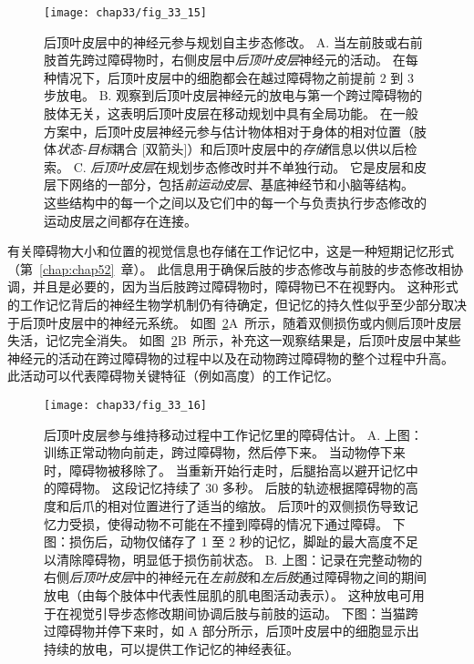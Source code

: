 \begin{figure}[htbp]
	\centering
	\texttt{[image: chap33/fig\_33\_15]}
	\caption{后顶叶皮层中的神经元参与规划自主步态修改。
		A. 当左前肢或右前肢首先跨过障碍物时，右侧皮层中\textit{后顶叶皮层}神经元的活动。
		在每种情况下，后顶叶皮层中的细胞都会在越过障碍物之前提前 2 到 3 步放电。
		B. 观察到后顶叶皮层神经元的放电与第一个跨过障碍物的肢体无关，这表明后顶叶皮层在移动规划中具有全局功能。
		在一般方案中，后顶叶皮层神经元参与估计物体相对于身体的相对位置（肢体\textit{状态-目标}耦合 [双箭头]）和后顶叶皮层中的\textit{存储}信息以供以后检索。
		C. \textit{后顶叶皮层}在规划步态修改时并不单独行动。
		它是皮层和皮层下网络的一部分，包括\textit{前运动皮层}、基底神经节和小脑等结构。
		这些结构中的每一个之间以及它们中的每一个与负责执行步态修改的运动皮层之间都存在连接\cite{drew2015taking}。}
	\label{fig:33_15}
\end{figure}


有关障碍物大小和位置的视觉信息也存储在工作记忆中，这是一种短期记忆形式（第~\ref{chap:chap52}~章）。
此信息用于确保后肢的步态修改与前肢的步态修改相协调，并且是必要的，因为当后肢跨过障碍物时，障碍物已不在视野内。
这种形式的工作记忆背后的神经生物学机制仍有待确定，但记忆的持久性似乎至少部分取决于后顶叶皮层中的神经元系统。
如图~\ref{fig:33_16}A~所示，随着双侧损伤或内侧后顶叶皮层失活，记忆完全消失。
如图~\ref{fig:33_16}B~所示，补充这一观察结果是，后顶叶皮层中某些神经元的活动在跨过障碍物的过程中以及在动物跨过障碍物的整个过程中升高。
此活动可以代表障碍物关键特征（例如高度）的工作记忆。


\begin{figure}[htbp]
	\centering
	\texttt{[image: chap33/fig\_33\_16]}
	\caption{后顶叶皮层参与维持移动过程中工作记忆里的障碍估计。
		A. 上图：训练正常动物向前走，跨过障碍物，然后停下来。
		当动物停下来时，障碍物被移除了。
		当重新开始行走时，后腿抬高以避开记忆中的障碍物。
		这段记忆持续了 30 多秒。
		后肢的轨迹根据障碍物的高度和后爪的相对位置进行了适当的缩放。
		后顶叶的双侧损伤导致记忆力受损，使得动物不可能在不撞到障碍的情况下通过障碍。
		下图：损伤后，动物仅储存了 1 至 2 秒的记忆，脚趾的最大高度不足以清除障碍物，明显低于损伤前状态\cite{mcvea2009object}。
		B. 上图：记录在完整动物的右侧\textit{后顶叶皮层}中的神经元在\textit{左前肢}和\textit{左后肢}通过障碍物之间的期间放电（由每个肢体中代表性屈肌的肌电图活动表示）。
		这种放电可用于在视觉引导步态修改期间协调后肢与前肢的运动。
		下图：当猫跨过障碍物并停下来时，如 A 部分所示，后顶叶皮层中的细胞显示出持续的放电，可以提供工作记忆的神经表征\cite{lajoie2010neurons}。}
	\label{fig:33_16}
\end{figure}



